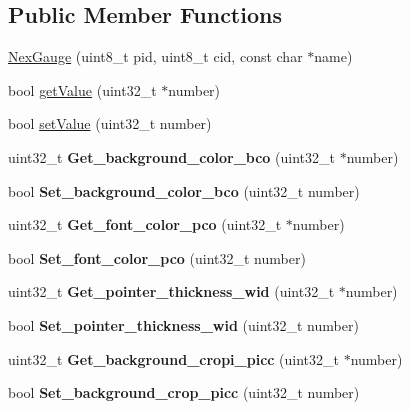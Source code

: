 \subsection*{Public Member Functions}
\begin{DoxyCompactItemize}
\item 
\hyperlink{class_nex_gauge_ac79040067d42f7f1ba16cc4a1dfd8b9b}{Nex\+Gauge} (uint8\+\_\+t pid, uint8\+\_\+t cid, const char $\ast$name)
\item 
bool \hyperlink{class_nex_gauge_aeea8933513ebba11584ad97f8c8b5e69}{get\+Value} (uint32\+\_\+t $\ast$number)
\item 
bool \hyperlink{class_nex_gauge_a448ce9ad69f54c156c325d578a96b765}{set\+Value} (uint32\+\_\+t number)
\item 
\hypertarget{class_nex_gauge_a03a6441159939961b64728dded177e92}{uint32\+\_\+t {\bfseries Get\+\_\+background\+\_\+color\+\_\+bco} (uint32\+\_\+t $\ast$number)}\label{class_nex_gauge_a03a6441159939961b64728dded177e92}

\item 
\hypertarget{class_nex_gauge_a2d2fe2d81da81e14a66260c501d644b3}{bool {\bfseries Set\+\_\+background\+\_\+color\+\_\+bco} (uint32\+\_\+t number)}\label{class_nex_gauge_a2d2fe2d81da81e14a66260c501d644b3}

\item 
\hypertarget{class_nex_gauge_a830152d58485d55f475376261d52ff62}{uint32\+\_\+t {\bfseries Get\+\_\+font\+\_\+color\+\_\+pco} (uint32\+\_\+t $\ast$number)}\label{class_nex_gauge_a830152d58485d55f475376261d52ff62}

\item 
\hypertarget{class_nex_gauge_ace00cba20b5cf5e1374c1a57bbf9a5f5}{bool {\bfseries Set\+\_\+font\+\_\+color\+\_\+pco} (uint32\+\_\+t number)}\label{class_nex_gauge_ace00cba20b5cf5e1374c1a57bbf9a5f5}

\item 
\hypertarget{class_nex_gauge_a50b4daf1b8dfb3cc5c329a3664341e11}{uint32\+\_\+t {\bfseries Get\+\_\+pointer\+\_\+thickness\+\_\+wid} (uint32\+\_\+t $\ast$number)}\label{class_nex_gauge_a50b4daf1b8dfb3cc5c329a3664341e11}

\item 
\hypertarget{class_nex_gauge_adacdbcb25fdf45654ebc88f572e3bce9}{bool {\bfseries Set\+\_\+pointer\+\_\+thickness\+\_\+wid} (uint32\+\_\+t number)}\label{class_nex_gauge_adacdbcb25fdf45654ebc88f572e3bce9}

\item 
\hypertarget{class_nex_gauge_a0a6b394a16b03beb6046ec3795d409fe}{uint32\+\_\+t {\bfseries Get\+\_\+background\+\_\+cropi\+\_\+picc} (uint32\+\_\+t $\ast$number)}\label{class_nex_gauge_a0a6b394a16b03beb6046ec3795d409fe}

\item 
\hypertarget{class_nex_gauge_a223fa8a91a87439047f22ca1c33660df}{bool {\bfseries Set\+\_\+background\+\_\+crop\+\_\+picc} (uint32\+\_\+t number)}\label{class_nex_gauge_a223fa8a91a87439047f22ca1c33660df}

\end{DoxyCompactItemize}
